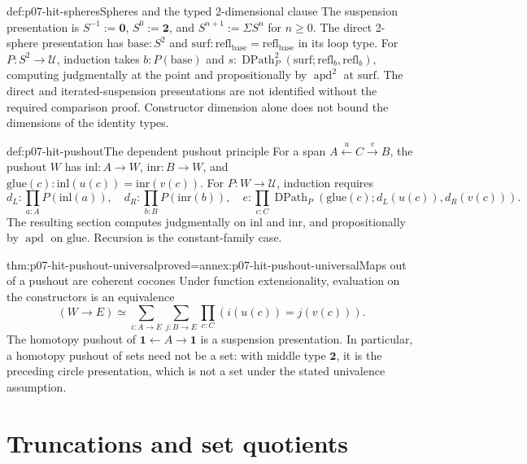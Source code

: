 \begin{hbdefinition}{def:p07-hit-spheres}{Spheres and the typed 2-dimensional clause}
The suspension presentation is \(S^{-1}:=\mathbf0\),
\(S^0:=\mathbf2\), and \(S^{n+1}:=\Sigma S^n\) for \(n\ge0\).
The direct 2-sphere presentation has \(\mathrm{base}:S^2\) and
\(\mathrm{surf}:\mathrm{refl}_{\mathrm{base}}=
\mathrm{refl}_{\mathrm{base}}\) in its loop type.
For \(P:S^2\to\mathcal U\), induction takes \(b:P(\mathrm{base})\)
and \(s:\operatorname{DPath}^2_P(\mathrm{surf};\mathrm{refl}_b,
\mathrm{refl}_b)\), computing judgmentally at the point and
propositionally by \(\operatorname{apd}^2\) at \(\mathrm{surf}\).
The direct and iterated-suspension presentations are not identified without
the required comparison proof. Constructor dimension alone does not bound
the dimensions of the identity types.
\end{hbdefinition}

\begin{hbdefinition}{def:p07-hit-pushout}{The dependent pushout principle}
For a span \(A\xleftarrow{u}C\xrightarrow{v}B\), the pushout \(W\)
has \(\mathrm{inl}:A\to W\), \(\mathrm{inr}:B\to W\), and
\(\mathrm{glue}(c):\mathrm{inl}(u(c))=\mathrm{inr}(v(c))\).
For \(P:W\to\mathcal U\), induction requires
\[
 d_L:\prod_{a:A}P(\mathrm{inl}(a)),\quad
 d_R:\prod_{b:B}P(\mathrm{inr}(b)),\quad
 e:\prod_{c:C}\operatorname{DPath}_P
      (\mathrm{glue}(c);d_L(u(c)),d_R(v(c))).
\]
The resulting section computes judgmentally on \(\mathrm{inl}\) and
\(\mathrm{inr}\), and propositionally by \(\operatorname{apd}\) on
\(\mathrm{glue}\). Recursion is the constant-family case.
\end{hbdefinition}

\begin{hbtheorem}{thm:p07-hit-pushout-universal}{proved=annex:p07-hit-pushout-universal}{Maps out of a pushout are coherent cocones}
Under function extensionality, evaluation on the constructors is an equivalence
\[
 (W\to E)\simeq
 \sum_{i:A\to E}\sum_{j:B\to E}
                \prod_{c:C}(i(u(c))=j(v(c))).
\]
The homotopy pushout of \(\mathbf1\leftarrow A\to\mathbf1\) is a
suspension presentation. In particular, a homotopy pushout of sets need not
be a set: with middle type \(\mathbf2\), it is the preceding circle
presentation, which is not a set under the stated univalence assumption.
\end{hbtheorem}
\section{Truncations and set quotients}

